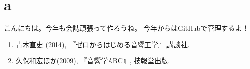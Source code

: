 \documentclass[11pt,b5paper,papersize,dvipdfmx]{jsbook}
\begin{document}
\section{a}
こんにちは。今年も会誌頑張って作ろうね。
今年からはGitHubで管理するよ！


\sanko
\begin{enumerate}
  \item 青木直史 (2014), 『ゼロからはじめる音響工学』,講談社.
  \item 久保和宏ほか(2009), 『音響学ABC』, 技報堂出版.
\end{enumerate}
\end{document}
